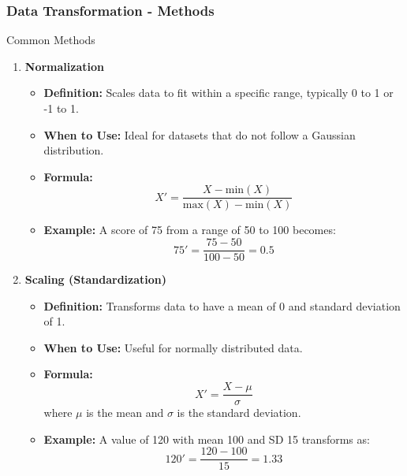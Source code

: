 \documentclass[aspectratio=169]{beamer}
\begin{document}
\begin{frame}[fragile]
    \frametitle{Data Transformation - Methods}
    \begin{block}{Common Methods}
        \begin{enumerate}
            \item \textbf{Normalization}
                \begin{itemize}
                    \item \textbf{Definition:} Scales data to fit within a specific range, typically 0 to 1 or -1 to 1.
                    \item \textbf{When to Use:} Ideal for datasets that do not follow a Gaussian distribution.
                    \item \textbf{Formula:}
                    \begin{equation}
                    X' = \frac{X - \text{min}(X)}{\text{max}(X) - \text{min}(X)}
                    \end{equation}
                    \item \textbf{Example:} A score of 75 from a range of 50 to 100 becomes:
                    \begin{equation}
                    75' = \frac{75-50}{100-50} = 0.5
                    \end{equation}
                \end{itemize}
                
            \item \textbf{Scaling (Standardization)}
                \begin{itemize}
                    \item \textbf{Definition:} Transforms data to have a mean of 0 and standard deviation of 1.
                    \item \textbf{When to Use:} Useful for normally distributed data.
                    \item \textbf{Formula:}
                    \begin{equation}
                    X' = \frac{X - \mu}{\sigma}
                    \end{equation}
                    where \( \mu \) is the mean and \( \sigma \) is the standard deviation.
                    \item \textbf{Example:} A value of 120 with mean 100 and SD 15 transforms as:
                    \begin{equation}
                    120' = \frac{120 - 100}{15} = 1.33
                    \end{equation}
                \end{itemize}
        \end{enumerate}
    \end{block}
\end{frame}
\end{document}

